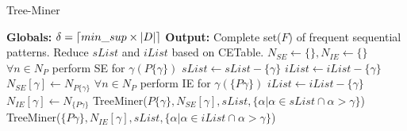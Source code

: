 \begin{algorithm}[!t]
    \scriptsize %
    \caption{Tree-Miner}
    \label{algorithm:tree_miner}
    \begin{algorithmic}[1]
        \State \textbf{Globals: }$\delta=\lceil min\_sup \times \vert D \vert\rceil$
        \State \textbf{Output: }Complete set($F$) of frequent sequential patterns.
            \State {}
            \State Reduce $sList$ and $iList$ based on CETable.
            \State {}
            \State $N_{SE}\gets \{\},N_{IE} \gets \{\}$
             
                \State $\forall n \in N_{P}$ perform SE for $\gamma(P\{\gamma\})$
                    \State $sList \gets sList -\{\gamma\}$
                        \State $iList \gets iList -\{\gamma\}$ \Comment{\ref{section:heuristic_pruning}}
                    \EndIf
                \Else {}
                    \State $N_{SE}[\gamma] \gets N_{P\{\gamma\}}$
                \EndIf
            \EndFor
              
                \State $\forall n \in N_{P}$ perform IE for $\gamma(\{P\gamma\})$
                \State $iList \gets iList -\{\gamma\}$
                \Else {}
                    \State $N_{IE}[\gamma] \gets N_{\{P\gamma\}}$
                \EndIf
            \EndFor
             
                \State TreeMiner($P\{\gamma\},N_{SE}[\gamma],sList,\{\alpha \vert \alpha \in sList \cap \alpha > \gamma \}$)
            \EndFor
             
                \State TreeMiner($\{P\gamma\},N_{IE}[\gamma],sList,\{\alpha \vert \alpha \in iList \cap \alpha > \gamma \}$)
            \EndFor
        \EndProcedure
    \end{algorithmic}
\end{algorithm}

